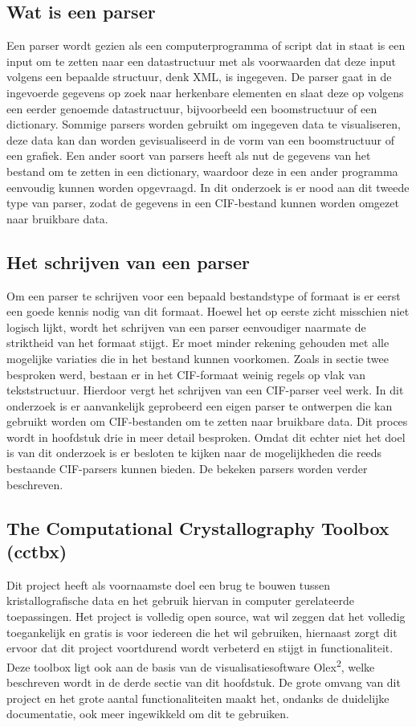 \subsection{Wat is een parser}
Een parser wordt gezien als een computerprogramma of script dat in staat is een input om te zetten naar een datastructuur met als voorwaarden dat deze input volgens een bepaalde structuur, denk XML, is ingegeven. De parser gaat in de ingevoerde gegevens op zoek naar herkenbare elementen en slaat deze op volgens een eerder genoemde datastructuur, bijvoorbeeld een boomstructuur of een dictionary. Sommige parsers worden gebruikt om ingegeven data te visualiseren, deze data kan dan worden gevisualiseerd in de vorm van een boomstructuur of een grafiek. Een ander soort van parsers heeft als nut de gegevens van het bestand om te zetten in een dictionary, waardoor deze in een ander programma eenvoudig kunnen worden opgevraagd. In dit onderzoek is er nood aan dit tweede type van parser, zodat de gegevens in een CIF-bestand kunnen worden omgezet naar bruikbare data.  

\par
\subsection{Het schrijven van een parser}
Om een parser te schrijven voor een bepaald bestandstype of formaat is er eerst een goede kennis nodig van dit formaat. Hoewel het op eerste zicht misschien niet logisch lijkt, wordt het schrijven van een parser eenvoudiger naarmate de striktheid van het formaat stijgt. Er moet minder rekening gehouden met alle mogelijke variaties die in het bestand kunnen voorkomen. Zoals in sectie twee besproken werd, bestaan er in het CIF-formaat weinig regels op vlak van tekststructuur. Hierdoor vergt het schrijven van een CIF-parser veel werk. In dit onderzoek is er aanvankelijk geprobeerd een eigen parser te ontwerpen die kan gebruikt worden om CIF-bestanden om te zetten naar bruikbare data. Dit proces wordt in hoofdstuk drie in meer detail besproken. Omdat dit echter niet het doel is van dit onderzoek is er besloten te kijken naar de mogelijkheden die reeds bestaande CIF-parsers kunnen bieden. De bekeken parsers worden verder beschreven.  

\par
\subsection{The Computational Crystallography Toolbox (cctbx)}
Dit project heeft als voornaamste doel een brug te bouwen tussen kristallografische data en het gebruik hiervan in computer gerelateerde toepassingen. Het project is volledig open source, wat wil zeggen dat het volledig toegankelijk en gratis is voor iedereen die het wil gebruiken, hiernaast zorgt dit ervoor dat dit project voortdurend wordt verbeterd en stijgt in functionaliteit. Deze toolbox ligt ook aan de basis van de visualisatiesoftware Olex\textsuperscript{2}, welke beschreven wordt in de derde sectie van dit hoofdstuk. De grote omvang van dit project en het grote aantal functionaliteiten maakt het, ondanks de duidelijke documentatie, ook meer ingewikkeld om dit te gebruiken. 

